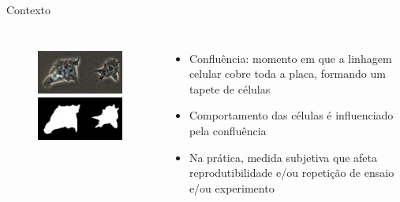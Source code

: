 \documentclass{beamer}
\begin{document}
\begin{frame}{Contexto}

   \begin{columns}
    \begin{figure}
      \includegraphics[width=1.1\textwidth]{imgs/pcm.png}\\
      \includegraphics[width=1.1\textwidth]{imgs/conflu.png}
    \end{figure}

    \begin{itemize}
    \item Confluência: momento em que a linhagem celular cobre toda a placa,
      formando um tapete de células
      \vfill
    \item Comportamento das células é influenciado pela confluência
      \vfill
    \item Na prática, medida subjetiva que afeta reprodutibilidade e/ou repetição
      de ensaio e/ou experimento

    \end{itemize}
  \end{columns}
\end{frame}
\end{document}
